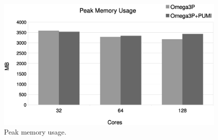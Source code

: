 \documentclass[a4paper]{article}
\begin{document}
\begin{figure}[ht]
\centering
  \includegraphics[width=\textwidth]{peak-memory-usage.eps}
  \caption{\label{fig:memusage} Peak memory usage.}
\end{figure}
\end{document}
